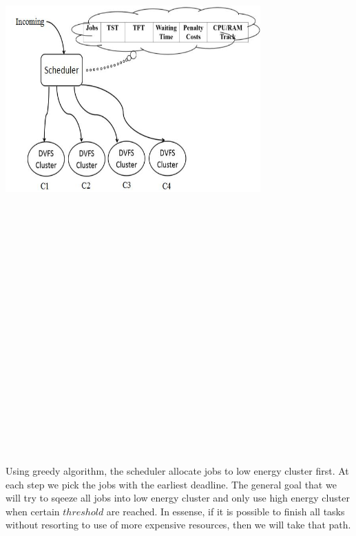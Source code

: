 \documentclass[conference]{IEEEtran}
\begin{document}
\includegraphics[width=9.8cm,height=26.8cm,keepaspectratio]{1-g.JPG}\\
\\Using greedy algorithm, the scheduler allocate jobs to low energy cluster first. At each step we pick the jobs with the earliest deadline. The general goal that we will try to sqeeze all jobs into low energy cluster and only use high energy cluster when certain $threshold$ are reached. In essense, if it is possible to finish all tasks without resorting to use of more expensive resources, then we will take that path.\\\\
\end{document}
